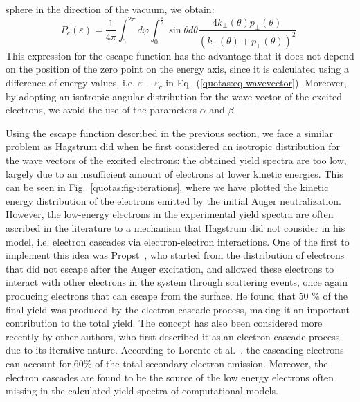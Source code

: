 \begin{refsection}
sphere in the direction of the vacuum, we obtain: 
\begin{equation} 
P_e(\varepsilon) = \frac{1}{4\pi} \int_{0}^{2\pi} d\varphi 
\int_0^{\frac{\pi}{2}} \sin{\theta} d\theta\frac{4k_\perp (\theta) p_\perp 
(\theta)}{(k_\perp (\theta) + p_\perp(\theta))^2}. 
\end{equation} 
This expression for the escape function has the advantage that it does not 
depend on the position of the zero point on the energy axis, since it is 
calculated using a difference of energy values, i.e. $\varepsilon - 
\varepsilon_c$ in Eq.~(\ref{quotas:eq-wavevector}). Moreover, by adopting an 
isotropic angular distribution for the wave vector of the excited electrons, 
we avoid the use of the parameters $\alpha$ and $\beta$. 
 

Using the escape function described in the previous section, we face a similar 
problem as Hagstrum did when he first considered an isotropic distribution for 
the wave vectors of the excited electrons: the obtained yield spectra are too 
low, largely due to an insufficient amount of electrons at lower kinetic 
energies. This can be seen in Fig.~\ref{quotas:fig-iterations}, where we have 
plotted the kinetic energy distribution of the electrons emitted by the 
initial Auger neutralization. However, the low-energy electrons in the 
experimental yield spectra are often ascribed in the literature to a mechanism 
that Hagstrum did not consider in his model, i.e. electron cascades via 
electron-electron interactions. One of the first to implement this idea was  
Propst~\cite{Propst1963}, who started from the distribution of electrons that 
did not escape after the Auger excitation, and allowed these electrons to 
interact with other electrons in the system through scattering events, once 
again producing electrons that can escape from the surface. He found that 50 
\% of the final yield was produced by the electron cascade process, making it 
an important contribution to the total yield. The concept has also been 
considered more recently by other authors, who first described it as an 
electron cascade process due to its iterative nature. According to Lorente et 
al.~\cite{Lorente1995}, the cascading electrons can account for 60\% of the 
total secondary electron emission. Moreover, the electron cascades are found 
to be the source of the low energy electrons often missing in the calculated 
yield spectra of computational models.\\ 
 

\end{refsection}
